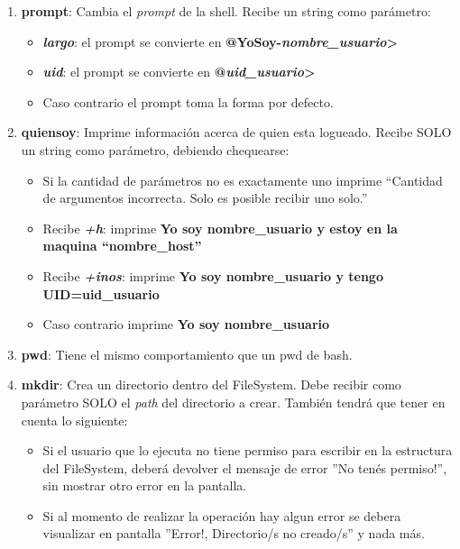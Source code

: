 \begin{enumerate}
\begin{enumerate}
\begin{enumerate}
		 \item \textbf{prompt}: Cambia el \textit{prompt} de la shell. Recibe un string como parámetro:
		 \begin{itemize}
		 	\item \textbf{\emph{largo}}: el prompt se convierte en \textbf{@YoSoy-\emph{nombre\_usuario}>}
		 	\item \textbf{\emph{uid}}: el prompt se convierte en \textbf{@\emph{uid\_usuario}>}
		 	\item Caso contrario el prompt toma la forma por defecto.
		 \end{itemize}
	     
		 \item \textbf{quiensoy}: Imprime información acerca de quien esta logueado. Recibe SOLO un string como parámetro, debiendo chequearse:
		 \begin{itemize}
		 	\item Si la cantidad de parámetros no es exactamente uno imprime ``Cantidad de argumentos incorrecta. Solo es posible recibir uno solo.''
		 	\item Recibe \textbf{\emph{+h}}: imprime \textbf{Yo soy nombre\_usuario y estoy en la maquina ``nombre\_host''}
		 	\item Recibe \textbf{\emph{+inos}}: imprime \textbf{Yo soy nombre\_usuario y tengo UID=uid\_usuario}
		 	\item Caso contrario imprime \textbf{Yo soy nombre\_usuario}
		 \end{itemize}

	     \item \textbf{pwd}: Tiene el mismo comportamiento que un pwd de bash.
	     
	     \item \textbf{mkdir}: Crea un directorio dentro del FileSystem. Debe recibir como parámetro SOLO el \textit{path} del directorio a crear. También tendrá que tener en cuenta lo siguiente:
	     \begin{itemize}
	     	\item Si el usuario que lo ejecuta no tiene permiso para escribir en la estructura del FileSystem, deberá devolver el mensaje de error ”No tenés permiso!”, sin mostrar otro error en la pantalla.
	     	\item Si al momento de realizar la operación hay algun error se debera visualizar en pantalla ”Error!, Directorio/s no creado/s” y nada más.
	     \end{itemize}	      
	    \end{enumerate}


\end{enumerate}
\end{enumerate}
